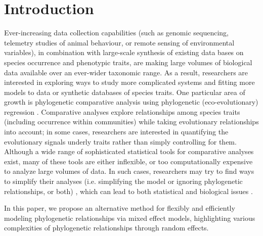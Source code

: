\section{Introduction}

Ever-increasing data collection capabilities (such as genomic sequencing, telemetry studies of animal behaviour, or remote sensing of environmental variables), in combination with large-scale synthesis of existing data bases on species occurrence and phenotypic traits, are making large volumes of biological data available over an ever-wider taxonomic range.
As a result, researchers are interested in exploring ways to study more complicated systems and fitting more models to data or synthetic databases of species traits.
One particular area of growth is phylogenetic comparative analysis using phylogenetic (eco-evolutionary) regression \cite{hansen2012interpreting}. 
Comparative analyses explore relationships among species traits (including occurrence within communities) while taking evolutionary relationships into account; in some cases, researchers are interested in quantifying the evolutionary signals underly traits rather than simply controlling for them.
Although a wide range of sophisticated statistical tools for comparative analyses exist, many of these tools are either inflexible, or too computationally expensive to analyze large volumes of data.
In such cases, researchers may try to find ways to simplify their analyses (i.e. simplifying the model or ignoring phylogenetic relationships, or both) \citep{bunnefeld2012island, ord2010adaptation},
which can lead to both statistical and biological issues
\cite{felsenstein1985phylogenies, li2017statistical}.
  
In this paper, we propose an alternative method for flexibly and efficiently modeling phylogenetic relationships via mixed effect models, highlighting various complexities of phylogenetic relationships through random effects.

